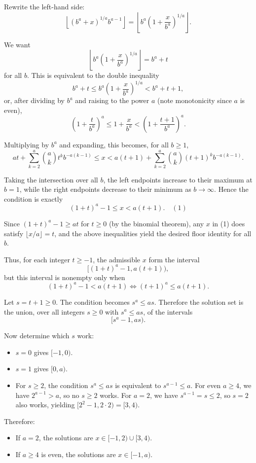 \documentclass[12pt,a4paper]{article}
\theoremstyle{definition}
\begin{document}
    Rewrite the left-hand side:
    $$\left\lfloor (b^a + x)^{1/a} b^{a-1} \right\rfloor = \left\lfloor b^a \left(1 + \frac{x}{b^a}\right)^{1/a} \right\rfloor.$$

    We want
    $$\left\lfloor b^a \left(1 + \frac{x}{b^a}\right)^{1/a} \right\rfloor = b^a + t$$
    for all $b$. This is equivalent to the double inequality
    $$b^a + t \leq b^a \left(1 + \frac{x}{b^a}\right)^{1/a} < b^a + t + 1,$$
    or, after dividing by $b^a$ and raising to the power $a$ (note monotonicity since $a$ is even),
    $$\left(1 + \frac{t}{b^a}\right)^a \leq 1 + \frac{x}{b^a} < \left(1 + \frac{t+1}{b^a}\right)^a.$$

    Multiplying by $b^a$ and expanding, this becomes, for all $b \geq 1$,
    $$at + \sum_{k=2}^a \binom{a}{k} t^k b^{-a(k-1)} \leq x < a(t+1) + \sum_{k=2}^a \binom{a}{k} (t+1)^k b^{-a(k-1)}.$$

    Taking the intersection over all $b$, the left endpoints increase to their maximum at $b=1$, while the right endpoints decrease to their minimum as $b \to \infty$. Hence the condition is exactly
    $$(1+t)^a - 1 \leq x < a(t+1). \quad (1)$$

    Since $(1+t)^a - 1 \geq at$ for $t \geq 0$ (by the binomial theorem), any $x$ in (1) does satisfy $\lfloor x/a \rfloor = t$, and the above inequalities yield the desired floor identity for all $b$.

    Thus, for each integer $t \geq -1$, the admissible $x$ form the interval
    $$[(1+t)^a - 1, a(t+1)),$$
    but this interval is nonempty only when
    $$(1+t)^a - 1 < a(t+1) \iff (t+1)^a \leq a(t+1).$$

    Let $s = t+1 \geq 0$. The condition becomes $s^a \leq a s$. Therefore the solution set is the union, over all integers $s \geq 0$ with $s^a \leq a s$, of the intervals
    $$[s^a - 1, a s).$$

    Now determine which $s$ work:
    \begin{itemize}
        \item $s = 0$ gives $[-1, 0)$.
        \item $s = 1$ gives $[0, a)$.
        \item For $s \geq 2$, the condition $s^a \leq a s$ is equivalent to $s^{a-1} \leq a$. For even $a \geq 4$, we have $2^{a-1} > a$, so no $s \geq 2$ works. For $a = 2$, we have $s^{a-1} = s \leq 2$, so $s = 2$ also works, yielding $[2^2 - 1, 2 \cdot 2) = [3, 4)$.
    \end{itemize}

    Therefore:
    \begin{itemize}
        \item If $a = 2$, the solutions are $x \in [-1, 2) \cup [3, 4)$.
        \item If $a \geq 4$ is even, the solutions are $x \in [-1, a)$.
    \end{itemize}
\end{document}

